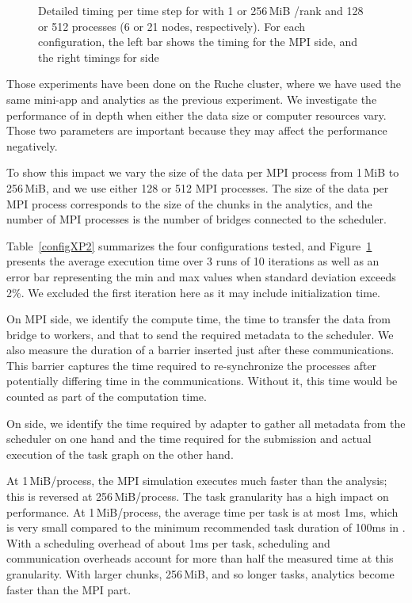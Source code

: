 \begin{figure}[tb]\centering

\caption{\label{XP2_time}Detailed timing per time step for \deisa with 1 or 256\,MiB /rank and 128 or 512 processes (6 or 21 nodes, respectively).
For each configuration, the left bar shows the timing for the MPI side, and the right timings for \dask side}
\end{figure}

Those experiments have been done on the Ruche cluster, where we have used the same mini-app and analytics as the previous experiment.
We investigate the performance of \deisa in depth when either the data size or computer resources vary. Those two parameters are important because they may affect the \dask performance negatively. 

To show this impact we vary the size of the data per MPI process from 1\,MiB to 256\,MiB, and we use either 128 or 512 MPI processes.
The size of the data per MPI process corresponds to the size of the chunks in the \dask analytics, and the number of MPI processes is the number of bridges connected to the scheduler.

Table~\ref{configXP2} summarizes the four configurations tested, and Figure~\ref{XP2_time} presents the average execution time over 3 runs of 10 iterations as well as an error bar representing the min and max values when standard deviation exceeds 2\%. We excluded the first iteration here as it may include initialization time.

On MPI side, we identify the compute time, the time to transfer the data from \deisa bridge to \dask workers, and that to send the required metadata to the scheduler.
We also measure the duration of a barrier inserted just after these communications.
This barrier captures the time required to re-synchronize the processes after potentially differing time in the communications.
Without it, this time would be counted as part of the computation time.

On \dask side, we identify the time required by \deisa adapter to gather all metadata from the scheduler on one hand and the time required for the submission and actual execution of the task graph on the other hand.

At 1\,MiB/process, the MPI simulation executes much faster than the analysis; this is reversed at 256\,MiB/process.
The task granularity has a high impact on \dask performance. At 1\,MiB/process, the average time per task is at most 1ms, which is very small compared to the minimum recommended task duration of 100ms\cite{noauthor_dask_chunk} in \dask. 
With a scheduling overhead of about 1ms per task, scheduling and communication overheads account for more than half the measured time at this granularity.
With larger chunks, 256\,MiB, and so longer tasks, \dask analytics become faster than the MPI part.

